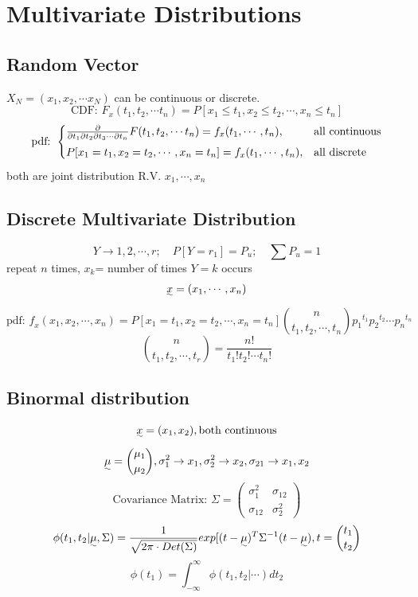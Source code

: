 \documentclass{article}
\begin{document}
\section{Multivariate Distributions}{
    \subsection{Random Vector}{
        \(X_N=(x_1, x_2, \cdots x_N)\) can be continuous or discrete.
        \[\text{CDF: } F_x(t_1, t_2, \cdots t_n)= P[x_1\leqslant t_1,x_2\leqslant t_2, \cdots, x_n\leqslant t_n]\]
        \[\text{pdf: } \begin{cases}
            \frac{\partial}{\partial t_1 \partial t_2 \partial t_3 \cdots \partial t_n} F(t_1, t_2, \cdots t_n)= f_{\uwave{x}}(t_1, \cdots, t_n), & \text{all continuous}\\
            P[x_1= t_1,x_2= t_2, \cdots, x_n= t_n]=f_{x}(t_1, \cdots, t_n), & \text{all discrete}
        \end{cases}\]
        both are joint distribution R.V. $x_1, \cdots, x_n$
    }
    \subsection{Discrete Multivariate Distribution}{
        \[ Y\rightarrow 1, 2, \cdots, r; \quad P[Y=r_1]=P_u; \quad \sum P_u= 1\]
        repeat $n$ times, $x_k$= number of times $Y = k$ occurs 
        \[\uwave{x}= (x_1, \cdots, x_n)\]
        \[\text{pdf: } \mathit{f_x}(x_1, x_2, \cdots, x_n) = P[x_1=t_1, x_2=t_2, \cdots, x_n=t_n]{n \choose t_1, t_2, \cdots, t_n}{p_1}^{t_1}{p_2}^{t_2}\cdots{p_n}^{t_n}\]
        \[{n \choose t_1, t_2, \cdots, t_r}= \frac{n !}{t_1! t_2! \cdots t_n!}\]
    }
    \subsection{Binormal distribution}{
        \[\uwave{x}=(x_1,x_2), \text{both continuous}\]
        \[\uwave{\mu}= { \mu_1 \choose \mu_2}, \sigma_1^2 \rightarrow x_1, \sigma_2^2 \rightarrow x_2, \sigma_{21} \rightarrow x_1,x_2 \]
        \[\text{Covariance Matrix: } 
        \Sigma= \begin{pmatrix} 
            \sigma_1^2 & \sigma_{12} \\ 
            \sigma_{12} & \sigma_2^2 
        \end{pmatrix} \]
        \[ \phi(t_1,t_2| \uwave{\mu}, \Sigma)= \frac{1}{\sqrt{2 \pi \cdot Det(\Sigma)}}exp[( \uwave{ t } -\uwave{\mu})^T \Sigma^{-1} (\uwave{t} -\uwave{\mu}),  \uwave{t} ={ t_1 \choose t_2} \]
        \[\phi(t_1)= \int_{-\infty}^{\infty} \phi(t_1,t_2| \cdots) dt_2\]

}}
\end{document}
